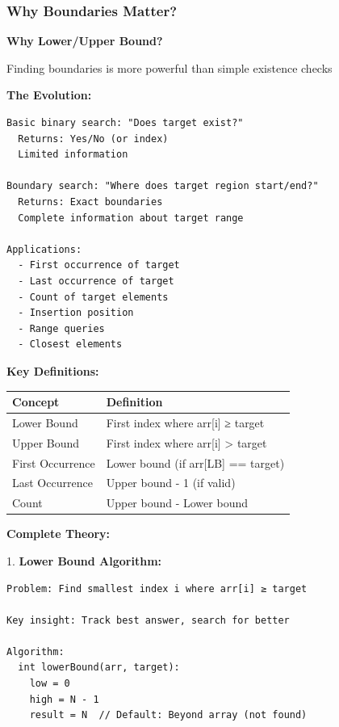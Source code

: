 \documentclass[11pt,a4paper,oneside]{book}
\begin{document}
\subsubsection{Why Boundaries Matter?}

\begin{tcolorbox}[
    enhanced,breakable,
    colback=white,
    colframe=deepblue,
    boxrule=1.5pt,
    arc=3mm,
    title=\textbf{The Boundary Search Paradigm}
]
\textbf{Why Lower/Upper Bound?}

Finding boundaries is more powerful than simple existence checks

\textbf{The Evolution:}
\begin{verbatim}
Basic binary search: "Does target exist?"
  Returns: Yes/No (or index)
  Limited information

Boundary search: "Where does target region start/end?"
  Returns: Exact boundaries
  Complete information about target range

Applications:
  - First occurrence of target
  - Last occurrence of target
  - Count of target elements
  - Insertion position
  - Range queries
  - Closest elements
\end{verbatim}

\textbf{Key Definitions:}
\begin{center}
\begin{tabular}{|l|l|}
\hline
\rowcolor{lightgray}
\textbf{Concept} & \textbf{Definition} \\
\hline
Lower Bound & First index where arr[i] ≥ target \\
\hline
Upper Bound & First index where arr[i] > target \\
\hline
First Occurrence & Lower bound (if arr[LB] == target) \\
\hline
Last Occurrence & Upper bound - 1 (if valid) \\
\hline
Count & Upper bound - Lower bound \\
\hline
\end{tabular}
\end{center}

\textbf{Complete Theory:}

1. \textbf{Lower Bound Algorithm:}
\begin{verbatim}
Problem: Find smallest index i where arr[i] ≥ target

Key insight: Track best answer, search for better

Algorithm:
  int lowerBound(arr, target):
    low = 0
    high = N - 1
    result = N  // Default: Beyond array (not found)
    

\end{verbatim}
\end{tcolorbox}
\end{document}
